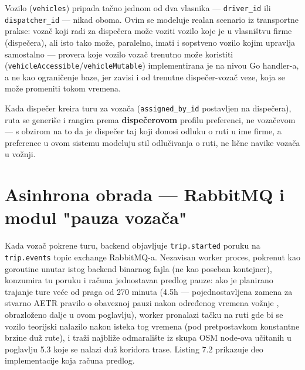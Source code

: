 Vozilo (\texttt{vehicles}) pripada tačno jednom od dva vlasnika — \texttt{driver\_id} ili \texttt{dispatcher\_id} — nikad oboma. Ovim se modeluje realan scenario iz transportne prakse: vozač koji radi za dispečera može voziti vozilo koje je u vlasništvu firme (dispečera), ali isto tako može, paralelno, imati i sopstveno vozilo kojim upravlja samostalno — provera koje vozilo vozač trenutno može koristiti (\texttt{vehicleAccessible}/\texttt{vehicleMutable}) implementirana je na nivou Go handler-a, a ne kao ograničenje baze, jer zavisi i od trenutne dispečer-vozač veze, koja se može promeniti tokom vremena.

Kada dispečer kreira turu za vozača (\texttt{assigned\_by\_id} postavljen na dispečera), ruta se generiše i rangira prema \textbf{dispečerovom} profilu preferenci, ne vozačevom — s obzirom na to da je dispečer taj koji donosi odluku o ruti u ime firme, a preference u ovom sistemu modeluju stil odlučivanja o ruti, ne lične navike vozača u vožnji.

\section{Asinhrona obrada — RabbitMQ i modul "pauza vozača"}

Kada vozač pokrene turu, backend objavljuje \texttt{trip.started} poruku na \texttt{trip.events} topic exchange RabbitMQ-a. Nezavisan worker proces, pokrenut kao goroutine unutar istog backend binarnog fajla (ne kao poseban kontejner), konzumira tu poruku i računa jednostavan predlog pauze: ako je planirano trajanje ture veće od praga od 270 minuta (4.5h — pojednostavljena zamena za stvarno AETR pravilo o obaveznoj pauzi nakon određenog vremena vožnje \cite{aetr}, obrazloženo dalje u ovom poglavlju), worker pronalazi tačku na ruti gde bi se vozilo teorijski nalazilo nakon isteka tog vremena (pod pretpostavkom konstantne brzine duž rute), i traži najbliže odmaralište iz skupa OSM node-ova učitanih u poglavlju 5.3 koje se nalazi duž koridora trase. Listing 7.2 prikazuje deo implementacije koja računa predlog.

